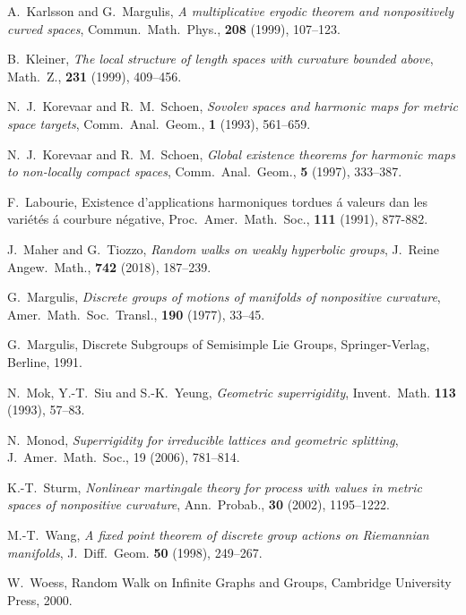 \documentclass[12pt]{amsart}
\numberwithin{equation}{section}
\theoremstyle{plain}
\theoremstyle{definition}
\theoremstyle{remark}
\begin{document}
\begin{thebibliography}{99}
A.~Karlsson and G.~Margulis, {\it A multiplicative ergodic theorem
and nonpositively curved spaces}, Commun.~Math.~Phys., {\bf 208} (1999),
107--123.


B.~Kleiner, {\it The local structure of length spaces with curvature
	bounded above}, Math.~Z., {\bf 231} (1999), 409--456. 

N.~J.~Korevaar and R.~M.~Schoen, 
{\it Sovolev spaces and harmonic maps for metric space targets}, 
Comm.~Anal.~Geom., {\bf 1} (1993), 561--659. 

N.~J.~Korevaar and R.~M.~Schoen, 
{\it Global existence theorems for harmonic maps to non-locally compact
	spaces}, Comm.~Anal.~Geom., {\bf 5} (1997), 333--387. 

 F.~Labourie, Existence d'applications harmoniques
	tordues \'a valeurs dan les vari\'et\'es \'a courbure n\'egative, 
	Proc.~Amer.~Math.~Soc., {\bf 111} (1991), 877-882.

J.~Maher and G.~Tiozzo, {\it Random walks on weakly hyperbolic groups},
 J.~Reine Angew.~Math., {\bf 742} (2018), 187--239. 

 G.~Margulis,
{\it Discrete groups of motions of manifolds of nonpositive curvature},
Amer.~Math.~Soc.~Transl., {\bf 190} (1977), 33--45.

 G.~Margulis, 
Discrete Subgroups of Semisimple Lie Groups, Springer-Verlag, Berline,
	1991. 

 N.~Mok, Y.-T.~Siu and S.-K.~Yeung, 
{\it Geometric superrigidity}, 
Invent.~Math. {\bf 113} (1993), 57--83.

N.~Monod, {\it Superrigidity for irreducible lattices and geometric
	splitting},
J.~Amer.~Math.~Soc., 19 (2006), 781--814. 

K.-T.~Sturm, {\it Nonlinear martingale theory for process with values in
	metric spaces of nonpositive curvature}, 
Ann.~Probab., {\bf 30} (2002), 1195--1222. 

 M.-T.~Wang,
{\it A fixed point theorem of discrete group actions on
Riemannian manifolds},
J.~Diff.~Geom. {\bf 50} (1998), 249--267.

W.~Woess, Random Walk on Infinite Graphs and Groups, 
Cambridge University Press, 2000. 
\end{thebibliography}
\end{document}
